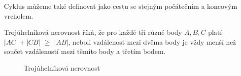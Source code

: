 \begin{definition}
    \label{definice:cyklus_jako_cesta}
    Cyklus můžeme také definovat jako cestu se stejným počátečním a koncovým vrcholem.    
\end{definition}

\begin{definition}
    \label{definice:trojuhelnikova_nerovnost}
    Trojúhelníková nerovnost říká, že pro každé tři různé body $A, B, C$ platí \textcolor{myblue}{$|AC|+|CB|$} $\geq$ \textcolor{myred}{$|AB|$}, neboli vzdálenost mezi dvěma body je vždy menší než součet vzdáleností mezi těmito body a třetím bodem. 

    \begin{figure}[h]
        \centering
        \caption{Trojúhelníková nerovnost}
    \end{figure}
    
\end{definition}